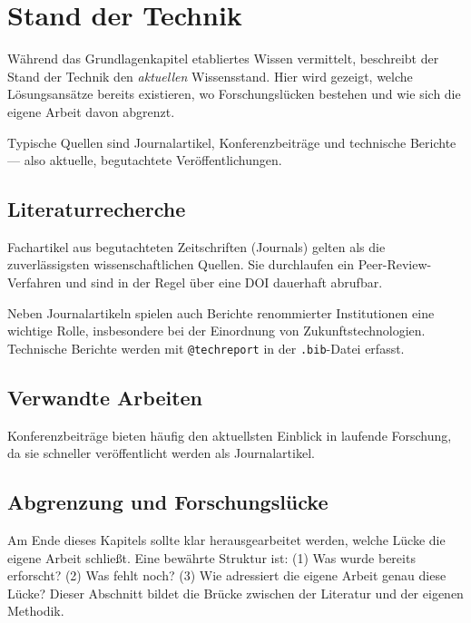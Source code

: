 \chapter{Stand der Technik}

Während das Grundlagenkapitel etabliertes Wissen vermittelt, beschreibt der Stand der Technik den \textit{aktuellen} Wissensstand. Hier wird gezeigt, welche Lösungsansätze bereits existieren, wo Forschungslücken bestehen und wie sich die eigene Arbeit davon abgrenzt.

Typische Quellen sind Journalartikel, Konferenzbeiträge und technische Berichte — also aktuelle, begutachtete Veröffentlichungen.

\section{Literaturrecherche}

Fachartikel aus begutachteten Zeitschriften (Journals) gelten als die zuverlässigsten wissenschaftlichen Quellen. Sie durchlaufen ein Peer-Review-Verfahren und sind in der Regel über eine DOI dauerhaft abrufbar.

Neben Journalartikeln spielen auch Berichte renommierter Institutionen eine wichtige Rolle, insbesondere bei der Einordnung von Zukunftstechnologien. Technische Berichte werden mit \texttt{@techreport} in der \texttt{.bib}-Datei erfasst.

\section{Verwandte Arbeiten}

Konferenzbeiträge bieten häufig den aktuellsten Einblick in laufende Forschung, da sie schneller veröffentlicht werden als Journalartikel.

\section{Abgrenzung und Forschungslücke}

Am Ende dieses Kapitels sollte klar herausgearbeitet werden, welche Lücke die eigene Arbeit schließt. Eine bewährte Struktur ist: (1) Was wurde bereits erforscht? (2) Was fehlt noch? (3) Wie adressiert die eigene Arbeit genau diese Lücke? Dieser Abschnitt bildet die Brücke zwischen der Literatur und der eigenen Methodik.